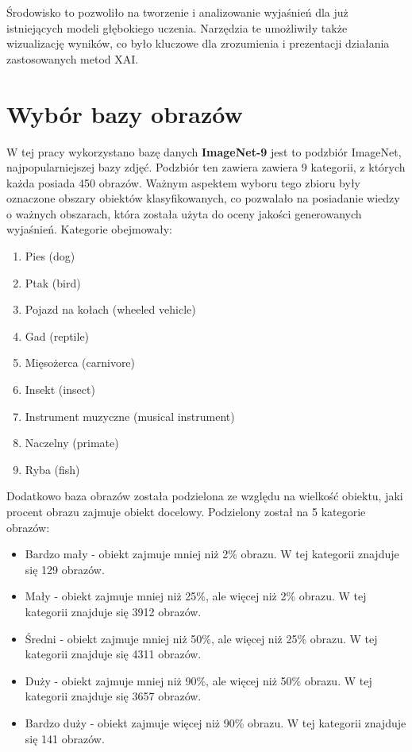 Środowisko to pozwoliło na tworzenie i analizowanie wyjaśnień dla już istniejących modeli głębokiego uczenia.
Narzędzia te umożliwiły także wizualizację wyników, co było kluczowe dla zrozumienia i prezentacji działania zastosowanych metod XAI.

\section*{Wybór bazy obrazów}

W tej pracy wykorzystano bazę danych \textbf{ImageNet-9}\cite{imagenet} jest to podzbiór ImageNet, najpopularniejszej bazy zdjęć.
Podzbiór ten zawiera zawiera 9 kategorii, z których każda posiada 450 obrazów.
Ważnym aspektem wyboru tego zbioru były oznaczone obszary obiektów klasyfikowanych, co pozwalało na posiadanie wiedzy o ważnych obszarach, która została użyta do oceny jakości generowanych wyjaśnień.
Kategorie obejmowały:
\begin{enumerate}
	\item Pies (dog)
	\item Ptak (bird)
	\item Pojazd na kołach (wheeled vehicle)
	\item Gad (reptile)
	\item Mięsożerca (carnivore)
	\item Insekt (insect)
	\item Instrument muzyczne (musical instrument)
	\item Naczelny (primate)
	\item Ryba (fish)
\end{enumerate}

Dodatkowo baza obrazów została podzielona ze względu na wielkość obiektu, jaki procent obrazu zajmuje obiekt docelowy.
Podzielony został na 5 kategorie obrazów:
\begin{itemize}
	\item Bardzo mały - obiekt zajmuje mniej niż 2\% obrazu. W tej kategorii znajduje się 129 obrazów.
	\item Mały - obiekt zajmuje mniej niż 25\%, ale więcej niż 2\% obrazu. W tej kategorii znajduje się 3912 obrazów.
	\item Średni - obiekt zajmuje mniej niż 50\%, ale więcej niż 25\% obrazu. W tej kategorii znajduje się 4311 obrazów.
	\item Duży - obiekt zajmuje mniej niż 90\%, ale więcej niż 50\% obrazu. W tej kategorii znajduje się 3657 obrazów.
	\item Bardzo duży - obiekt zajmuje więcej niż 90\% obrazu. W tej kategorii znajduje się 141 obrazów.
\end{itemize}

